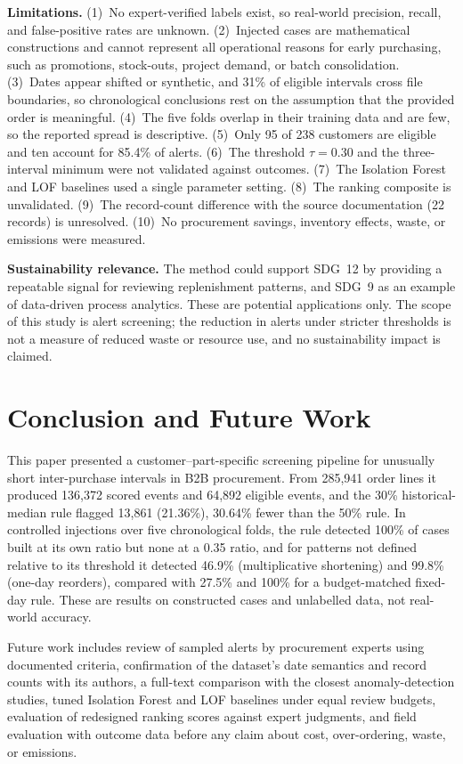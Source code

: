 \documentclass[conference]{IEEEtran}
\begin{document}
\textbf{Limitations.} (1)~No expert-verified labels exist, so real-world precision, recall, and false-positive rates are unknown. (2)~Injected cases are mathematical constructions and cannot represent all operational reasons for early purchasing, such as promotions, stock-outs, project demand, or batch consolidation. (3)~Dates appear shifted or synthetic, and 31\% of eligible intervals cross file boundaries, so chronological conclusions rest on the assumption that the provided order is meaningful. (4)~The five folds overlap in their training data and are few, so the reported spread is descriptive. (5)~Only 95 of 238 customers are eligible and ten account for 85.4\% of alerts. (6)~The threshold $\tau=0.30$ and the three-interval minimum were not validated against outcomes. (7)~The Isolation Forest and LOF baselines used a single parameter setting. (8)~The ranking composite is unvalidated. (9)~The record-count difference with the source documentation (22 records) is unresolved. (10)~No procurement savings, inventory effects, waste, or emissions were measured.

\textbf{Sustainability relevance.} The method could support SDG~12 by providing a repeatable signal for reviewing replenishment patterns, and SDG~9 as an example of data-driven process analytics. These are potential applications only. The scope of this study is alert screening; the reduction in alerts under stricter thresholds is not a measure of reduced waste or resource use, and no sustainability impact is claimed.

\section{Conclusion and Future Work}
This paper presented a customer--part-specific screening pipeline for unusually short inter-purchase intervals in B2B procurement. From 285,941 order lines it produced 136,372 scored events and 64,892 eligible events, and the 30\% historical-median rule flagged 13,861 (21.36\%), 30.64\% fewer than the 50\% rule. In controlled injections over five chronological folds, the rule detected 100\% of cases built at its own ratio but none at a 0.35 ratio, and for patterns not defined relative to its threshold it detected 46.9\% (multiplicative shortening) and 99.8\% (one-day reorders), compared with 27.5\% and 100\% for a budget-matched fixed-day rule. These are results on constructed cases and unlabelled data, not real-world accuracy.

Future work includes review of sampled alerts by procurement experts using documented criteria, confirmation of the dataset's date semantics and record counts with its authors, a full-text comparison with the closest anomaly-detection studies, tuned Isolation Forest and LOF baselines under equal review budgets, evaluation of redesigned ranking scores against expert judgments, and field evaluation with outcome data before any claim about cost, over-ordering, waste, or emissions.
\end{document}
